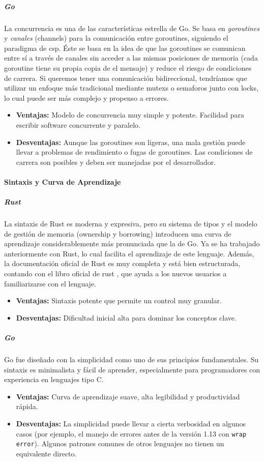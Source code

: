 \subparagraph{Go}
La concurrencia es una de las características estrella de Go. Se basa en \textit{goroutines} y \textit{canales} (channels) para la comunicación entre goroutines, siguiendo el paradigma de \acrfull{csp}.
Éste se basa en la idea de que las goroutines se comunican entre sí a través de canales sin acceder a las mismas posiciones de memoria (cada goroutine tiene su propia copia de el mensaje) y reduce el riesgo de condiciones de carrera.
Si queremos tener una comunicación bidireccional, tendríamos que utilizar un enfoque más tradicional mediante \glspl{mutex} o \glspl{semaforo} junto con \glspl{lock}, lo cual puede ser más complejo y propenso a errores.
\begin{itemize}
    \item \textbf{Ventajas:} Modelo de concurrencia muy simple y potente. Facilidad para escribir software concurrente y paralelo.
    \item \textbf{Desventajas:} Aunque las goroutines son ligeras, una mala gestión puede llevar a problemas de rendimiento o fugas de goroutines. Las condiciones de carrera son posibles y deben ser manejadas por el desarrollador.
\end{itemize}

\paragraph{Sintaxis y Curva de Aprendizaje}
\subparagraph{Rust}
La sintaxis de Rust es moderna y expresiva, pero su sistema de tipos y el modelo de gestión de memoria (ownership y borrowing) introducen una curva de aprendizaje considerablemente más pronunciada que la de Go.
Ya se ha trabajado anteriormente con Rust, lo cual facilita el aprendizaje de este lenguaje.
Además, la documentación oficial de Rust es muy completa y está bien estructurada, contando con el libro oficial de rust \cite{rustbook2021}, que ayuda a los nuevos usuarios a familiarizarse con el lenguaje.
\begin{itemize}
    \item \textbf{Ventajas:} Sintaxis potente que permite un control muy granular.
    \item \textbf{Desventajas:} Dificultad inicial alta para dominar los conceptos clave.
\end{itemize}

\subparagraph{Go}
Go fue diseñado con la simplicidad como uno de sus principios fundamentales. Su sintaxis es minimalista y fácil de aprender, especialmente para programadores con experiencia en lenguajes tipo C.
\begin{itemize}
    \item \textbf{Ventajas:} Curva de aprendizaje suave, alta legibilidad y productividad rápida.
    \item \textbf{Desventajas:} La simplicidad puede llevar a cierta verbosidad en algunos casos (por ejemplo, el manejo de errores antes de la versión 1.13 con \texttt{wrap error}). Algunos patrones comunes de otros lenguajes no tienen un equivalente directo.
\end{itemize}


